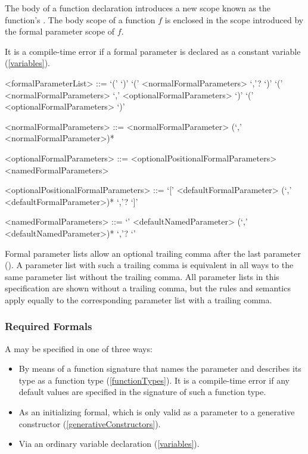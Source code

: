 \documentclass[makeidx]{article}
\begin{document}
\LMHash{}%
The body of a function declaration introduces a new scope known as the function's
.
The body scope of a function $f$ is enclosed in the scope introduced by the formal parameter scope of $f$.



\LMHash{}%
It is a compile-time error if a formal parameter is declared as a constant variable (\ref{variables}).

\begin{grammar}
<formalParameterList> ::= `(' `)'
  \alt `(' <normalFormalParameters> `,'? `)'
  \alt `(' <normalFormalParameters> `,' <optionalFormalParameters> `)'
  \alt `(' <optionalFormalParameters> `)'

<normalFormalParameters> ::= \gnewline{}
  <normalFormalParameter> (`,' <normalFormalParameter>)*

<optionalFormalParameters> ::= <optionalPositionalFormalParameters>
  \alt <namedFormalParameters>

<optionalPositionalFormalParameters> ::= \gnewline{}
  `[' <defaultFormalParameter> (`,' <defaultFormalParameter>)* `,'? `]'

<namedFormalParameters> ::= \gnewline{}
  `{' <defaultNamedParameter> (`,' <defaultNamedParameter>)* `,'? `}'
\end{grammar}

Formal parameter lists allow an optional trailing comma after the last parameter ().
A parameter list with such a trailing comma is equivalent in all ways to the same parameter list without the trailing comma.
All parameter lists in this specification are shown without a trailing comma, but the rules and semantics apply equally to the corresponding parameter list with a trailing comma.


\subsubsection{Required Formals}

\LMHash{}%
A  may be specified in one of three ways:
\begin{itemize}
\item By means of a function signature that names the parameter and describes its type as a function type (\ref{functionTypes}).
It is a compile-time error if any default values are specified in the signature of such a function type.%
\item As an initializing formal, which is only valid as a parameter to a generative constructor (\ref{generativeConstructors}). %
\item Via an ordinary variable declaration (\ref{variables}).
\end{itemize}
\end{document}
